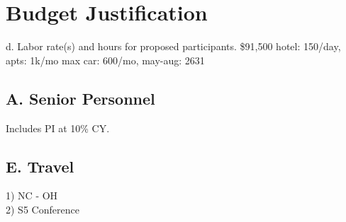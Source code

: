 \section{Budget Justification}

d. Labor rate(s) and hours for proposed participants.
\$91,500
hotel: 150/day, apts: 1k/mo max
car: 600/mo, may-aug: 2631


\subsection{A. Senior Personnel}
 Includes PI at 10\% CY.

\subsection{E. Travel}
1) NC - OH\\
2) S5 Conference

%
